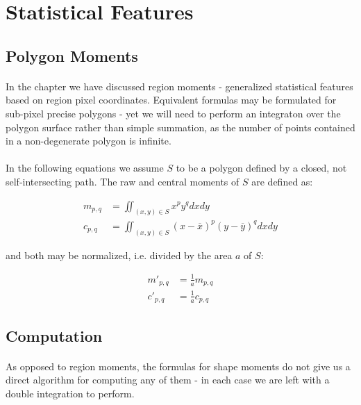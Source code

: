 
\section{Statistical Features}

\subsection{Polygon Moments}

\paragraph*{}
In the  chapter we have discussed region moments - generalized statistical features based on region pixel coordinates. Equivalent formulas may be formulated for sub-pixel precise polygons - yet we will need to perform an integraton over the polygon surface rather than simple summation, as the number of points contained in a non-degenerate polygon is infinite.

\paragraph*{}
In the following equations we assume $S$ to be a polygon defined by a closed, not self-intersecting path. The raw and central moments of $S$ are defined as:

\begin{align*}
	m_{p,q} &= \iint_{(x,y) \in S} x^p y^q dx dy \\
	c_{p,q} &= \iint_{(x,y) \in S} (x-\overline{x})^p (y-\overline{y})^q dx dy
\end{align*}

and both may be normalized, i.e. divided by the area $a$ of $S$:

\begin{align*}
	m'_{p,q} &= \frac{1}{a} m_{p,q}\\
	c'_{p,q} &= \frac{1}{a} c_{p,q}
\end{align*}

\subsection{Computation}

\paragraph*{}
As opposed to region moments, the formulas for shape moments do not give us a direct algorithm for computing any of them - in each case we are left with a double integration to perform.

